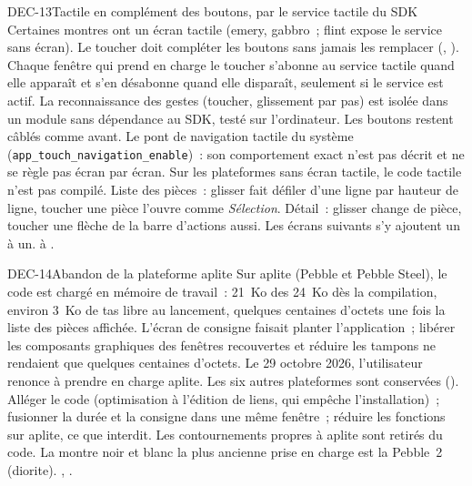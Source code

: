\begin{decision}{DEC-13}{Tactile en complément des boutons, par le service tactile du SDK}
   Certaines montres ont un écran tactile (emery, gabbro~; flint expose le service
  sans écran). Le toucher doit compléter les boutons sans jamais les remplacer
  (, ).
   Chaque fenêtre qui prend en charge le toucher s'abonne au service tactile quand
  elle apparaît et s'en désabonne quand elle disparaît, seulement si le service est actif. La
  reconnaissance des gestes (toucher, glissement par pas) est isolée dans un module sans dépendance au SDK,
  testé sur l'ordinateur. Les boutons restent câblés comme avant.
   Le pont de navigation tactile du système
  (\texttt{app\_touch\_navigation\_enable})~: son comportement exact n'est pas décrit et ne se règle pas
  écran par écran.
   Sur les plateformes sans écran tactile, le code tactile n'est pas compilé.
  Liste des pièces~: glisser fait défiler d'une ligne par hauteur de ligne, toucher une pièce l'ouvre
  comme \emph{Sélection}. Détail~: glisser change de pièce, toucher une flèche de la barre d'actions
  aussi. Les écrans suivants s'y ajoutent un à un.
    à .
\end{decision}

\begin{decision}{DEC-14}{Abandon de la plateforme aplite}
   Sur aplite (Pebble et Pebble Steel), le code est chargé en mémoire de travail~: 21~Ko des
  24~Ko dès la compilation, environ 3~Ko de tas libre au lancement, quelques centaines d'octets une fois
  la liste des pièces affichée. L'écran de consigne faisait planter l'application~; libérer les composants
  graphiques des fenêtres recouvertes et réduire les tampons ne rendaient que quelques centaines d'octets.
   Le 29 octobre 2026, l'utilisateur renonce à prendre en charge aplite. Les six autres
  plateformes sont conservées ().
   Alléger le code (optimisation à l'édition de liens, qui empêche l'installation)~;
  fusionner la durée et la consigne dans une même fenêtre~; réduire les fonctions sur aplite, ce que
   interdit.
   Les contournements propres à aplite sont retirés du code. La montre noir et blanc la
  plus ancienne prise en charge est la Pebble~2 (diorite).
   , .
\end{decision}
